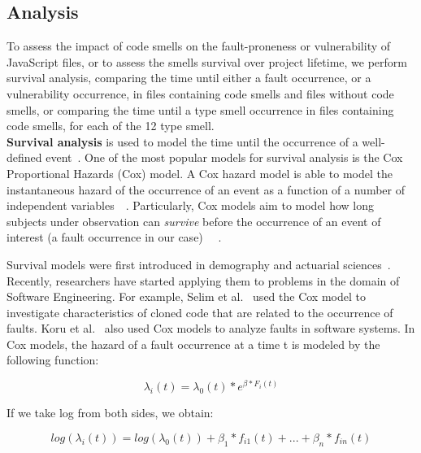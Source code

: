 \subsection{Analysis}\label{survival}
To assess the impact of code smells on the fault-proneness {\color{blue}or vulnerability of JavaScript files, or to assess the smells survival over project lifetime,} we perform survival analysis, comparing the time until {\color{blue}either a fault occurrence, or a vulnerability occurrence}, in files containing code smells and files without code smells, {\color{blue}or comparing the time until a type smell occurrence in files containing code smells, for each of the 12 type smell.}\\
\textbf{Survival analysis} is used to model the time until the occurrence of a well-defined event~\cite{fox2010r}. One of the most popular models for survival analysis is the Cox Proportional Hazards (Cox) model. A Cox hazard model is able to model the instantaneous hazard of the occurrence of an event as a function of a number of independent variables~\cite{koru2008theory}~\cite{singer2003applied}. Particularly, Cox models aim to model how long subjects under observation can \textsl{survive} before the occurrence of an event of interest (a fault occurrence in our case) ~\cite{singer2003applied}~\cite{selim2010studying}.

Survival models were first introduced in demography and actuarial sciences~\cite{Westergaard}. Recently, researchers have started applying them to problems in the domain of Software Engineering. For example, Selim et al.~\cite{selim2010studying} used the Cox model to investigate characteristics of cloned code that are related to the occurrence of faults. Koru et al.~\cite{koru2007modeling} also used Cox models to analyze faults in software systems. %
In Cox models, the hazard of a fault occurrence at a time t is modeled by the following function:

\begin{equation}\label{eq1}
\lambda_{i}(t) = \lambda_{0}(t)* e ^ {\beta*{F_{i}}(t)}
\end{equation}

If we take log from both sides, we obtain:

\begin{equation}\label{eq2}
log(\lambda_{i}(t)) = log(\lambda_{0}(t)) + {\beta_{1}*{f_{i1}}(t)} + ... + {\beta_{n}*{f_{in}}(t)}
\end{equation}

